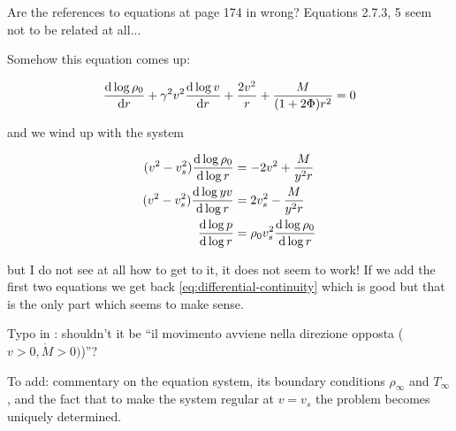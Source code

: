 \documentclass[main.tex]{subfiles}
\begin{document}
\begin{greenbox}
  Are the references to equations at page 174 in \cite{Nobili:2000} wrong? Equations 2.7.3, 5 seem not to be related at all...

  Somehow this equation comes up:

  \begin{equation}
    \dv{\log \rho_0 }{r} + \gamma^2 v^2 \dv{\log v }{r}  + \frac{2 v^2}{r} + \frac{M}{(1+2 \Phi) r^2} = 0
  \end{equation}

  and we wind up with the system

  \begin{subequations}
  \begin{align}
    (v^2-v_s^2) \dv{\log \rho_0}{\log r} &= - 2v^2 + \frac{M}{y^2 r}  \\
    (v^2-v_s^2) \dv{\log yv }{\log r} &=  2v_s^2 - \frac{M}{y^2 r}  \\
    \dv{\log p }{\log r} &= \rho_0 v_s^2 \dv{\log \rho_0}{\log r }
  \end{align}
  \end{subequations}

  but I do not see at all how to get to it, it does not seem to work!
  If we add the first two equations we get back \eqref{eq:differential-continuity} which is good but that is the only part which seems to make sense.
\end{greenbox}

\begin{greenbox}
  Typo in \cite[page 175]{Nobili:2000}: shouldn't it be ``il movimento avviene nella direzione opposta (\(v>0, \dot{M}>0)\))''?
\end{greenbox}

\begin{greenbox}
  To add: commentary on the equation system, its boundary conditions \(\rho_\infty\) and \(T_\infty\), and the fact that to make the system regular at \(v = v_s\) the problem becomes uniquely determined.
\end{greenbox}
\end{document}
